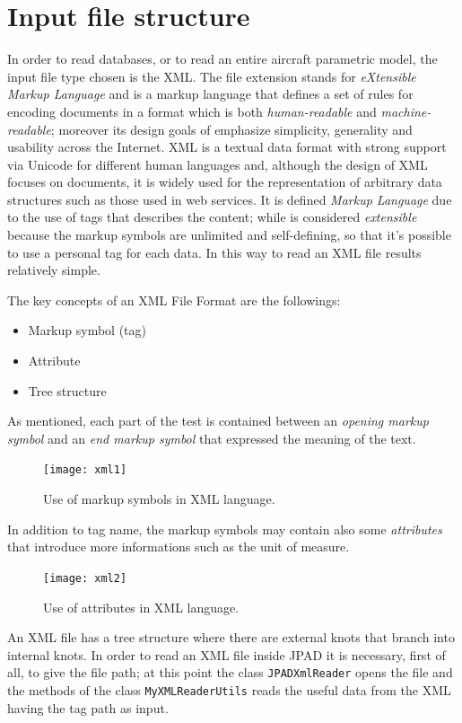 \section{Input file structure}
\label{par:InputFile}
In order to read databases, or to read an entire aircraft parametric model, the input file type chosen is the XML. The file extension stands for \emph{eXtensible Markup Language} and is a markup language that defines a set of rules for encoding documents in a format which is both \emph{human-readable} and \emph{machine-readable}; moreover its design goals of emphasize simplicity, generality and usability across the Internet. XML is a textual data format with strong support via Unicode for different human languages and, although the design of XML focuses on documents, it is widely used for the representation of arbitrary data structures such as those used in web services. It is defined \emph{Markup Language} due to the use of tags that describes the content; while is considered \emph{extensible} because the markup symbols are unlimited and self-defining, so that it's possible to use a personal tag for each data. In this way to read an XML file results relatively simple.\cite{wiki:xml}

\bigskip
\noindent
The key concepts of an XML File Format are the followings:
%
\begin{itemize}
\item Markup symbol (tag)
\item Attribute
\item Tree structure
\end{itemize}
%
As mentioned, each part of the test is contained between an \emph{opening markup symbol} and an \emph{end markup symbol} that expressed the meaning of the text.
%
\begin{figure}[H]
\centering
{\texttt{[image: xml1]}
} 
\caption{Use of markup symbols in XML language.}
\end{figure}
%
\noindent
In addition to tag name, the markup symbols may contain also some \emph{attributes} that introduce more informations such as the unit of measure.
%
\begin{figure}[H]
\centering
{\texttt{[image: xml2]} 
}
\caption{Use of attributes in XML language.}
\end{figure}
%
\noindent
An XML file has a tree structure where there are external knots that branch into internal knots. In order to read an XML file inside \gls{JPAD} it is necessary, first of all, to give the file path; at this point the class \lstinline[language=Java]!JPADXmlReader! opens the file and  the methods of the class \lstinline[language=Java]!MyXMLReaderUtils! reads the useful data from the XML having the tag path as input. 

